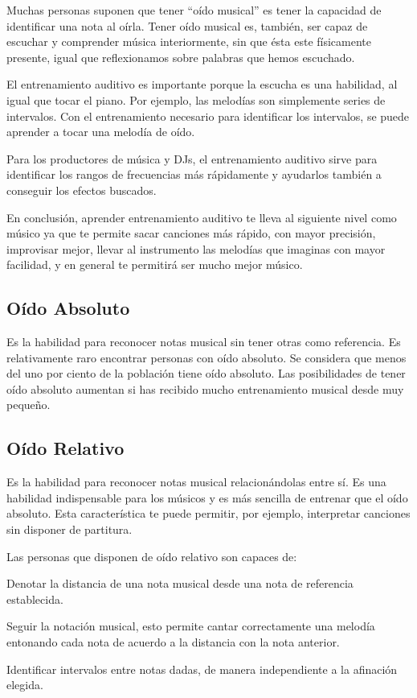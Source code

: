 \documentclass[12pt,twoside,titlepage]{report}
\begin{document}
Muchas personas suponen que tener “oído musical” es tener la capacidad de identificar una nota al oírla. Tener oído musical es, también, ser capaz de escuchar y comprender música interiormente, sin que ésta este físicamente presente, igual que reflexionamos sobre palabras que hemos escuchado.

El entrenamiento auditivo es importante porque la escucha es una habilidad, al igual que tocar el piano. Por ejemplo, las melodías son simplemente series de intervalos. Con el entrenamiento necesario para identificar los intervalos, se puede aprender a tocar una melodía de oído.

Para los productores de música y DJs, el entrenamiento auditivo sirve para identificar los rangos de frecuencias más rápidamente y ayudarlos también a conseguir los efectos buscados.

En conclusión, aprender entrenamiento auditivo te lleva al siguiente nivel como músico ya que te permite sacar canciones más rápido, con mayor precisión, improvisar mejor, llevar al instrumento las melodías que imaginas con mayor facilidad, y en general te permitirá ser mucho mejor músico.

\subsection{Oído Absoluto}

Es la habilidad para reconocer notas musical sin tener otras como referencia. Es relativamente raro encontrar personas con oído absoluto. Se considera que menos del uno por ciento de la población tiene oído absoluto. Las posibilidades de tener oído absoluto aumentan si has recibido mucho entrenamiento musical desde muy pequeño.

\subsection{Oído Relativo}

Es la habilidad para reconocer notas musical relacionándolas entre sí. Es una habilidad indispensable para los músicos y es más sencilla de entrenar que el oído absoluto. Esta característica te puede permitir, por ejemplo, interpretar canciones sin disponer de partitura.

Las personas que disponen de oído relativo son capaces de:
\begin{compactitem}
    \item Denotar la distancia de una nota musical desde una nota de referencia establecida.
    \item Seguir la notación musical, esto permite cantar correctamente una melodía entonando cada nota de acuerdo a la distancia con la nota anterior.
    \item Identificar intervalos entre notas dadas, de manera independiente a la afinación elegida.
\end{compactitem}
\end{document}
